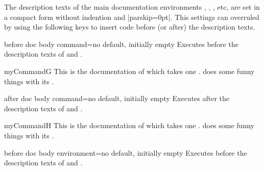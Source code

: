 \clearpage

The description texts of the main documentation environments ,
, , etc, are set in a compact form without
indention and |parskip=0pt|. This settings can overruled by using the following
keys to insert code before (or after) the description texts.

\begin{docTcbKey}[][doc new=2015-10-09]{before doc body command}{=}{no default, initially empty}
  Executes  before the description texts
  of  and .
\begin{dispExample}

\begin{docCommand*}{myCommandG}{}
  This is the documentation of  which takes one .
   does some funny things with its .
\end{docCommand*}
\end{dispExample}
\end{docTcbKey}


\begin{docTcbKey}[][doc new=2015-10-09]{after doc body command}{=}{no default, initially empty}
  Executes  after the description texts
  of  and .
\begin{dispExample}

\begin{docCommand*}{myCommandH}{}
  This is the documentation of  which takes one .
   does some funny things with its .
\end{docCommand*}
\end{dispExample}
\end{docTcbKey}


\begin{docTcbKey}[][doc new=2015-10-09]{before doc body environment}{=}{no default, initially empty}
  Executes  before the description texts
  of  and .
\end{docTcbKey}

